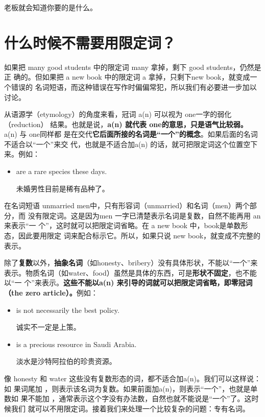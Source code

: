 老板就会知道你要的是什么。

\section{什么时候不需要用限定词？}

如果把 many good students 中的限定词 many 拿掉，剩下 good students，仍然是正
确的。但如果把 a new book 中的限定词 a 拿掉，只剩下new book，就变成一个错误的
名词短语，而这种错误在写作时偏偏常犯，所以我们有必要进一步加以讨论。

从语源学（etymology）的角度来看，冠词 a(n) 可以视为 one一字的弱化（reduction）
结果。也就是说，\textbf{a(n) 就代表 one的意思，只是语气比较弱。} a(n) 与 one同样都
是在交代\textbf{它后面所接的名词是“一个”的概念}。如果后面的名词不适合以“一个”来交
代，也就是不适合加a(n) 的话，就可把限定词这个位置空下来。例如：
\begin{itemize}
\item {} are a rare species these days.

  未婚男性目前是稀有品种了。
\end{itemize}

在名词短语 unmarried men中，只有形容词（unmarried）和名词（men）两个部分，而
没有限定词。这是因为men 一字已清楚表示名词是复数，自然不能再用 an来表示“一
个”，这时就可以把限定词省略。在 a new book 中，book是单数形态，因此要用限定
词来配合标示它。所以，如果只说 new book，就变成不完整的表示。

除了\textbf{复数}以外，\textbf{抽象名词}（如honesty、bribery）没有具体形状，不能以“一个”来
表示。物质名词（如water、food）虽然是具体的东西，可是\textbf{形状不固定}，也不能以“一
个”来表示。\textbf{这些不能以a(n) 来引导的词就可以把限定词省略，即零冠词（the
  zero article）。}例如：

\begin{itemize}
\item  {} is not necessarily the best policy.

  诚实不一定是上策。

\item  {} is a precious resource in Saudi Arabia.

  淡水是沙特阿拉伯的珍贵资源。
\end{itemize}

像 honesty 和 water 这些没有复数形态的词，都不适合加a(n)。我们可以这样说：如
果词尾加 ，则表示该名词为复数。如果前面加a(n)，则表示“一个”，也就是单数如
果不能加 ，通常表示这个字没有办法数，自然也就不能说是“一个”了。这时候我们
就可以不用限定词。接着我们来处理一个比较复杂的问题：专有名词。


